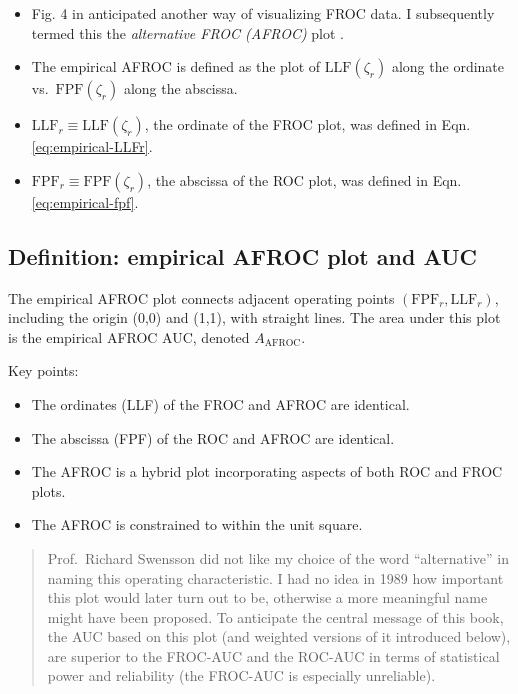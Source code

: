 \documentclass[
]{book}
\providecommand{\tightlist}{%
  \setlength{\itemsep}{0pt}\setlength{\parskip}{0pt}}
\begin{document}
\begin{itemize}
\tightlist
\item
  Fig. 4 in \citep{bunch1977free} anticipated another way of visualizing FROC data. I subsequently termed this the \emph{alternative FROC (AFROC)} plot \citep{chakraborty1989maximum}.
\item
  The empirical AFROC is defined as the plot of \(\text{LLF}(\zeta_r)\) along the ordinate vs.~\(\text{FPF}(\zeta_r)\) along the abscissa.
\item
  \(\text{LLF}_r \equiv \text{LLF}(\zeta_r)\), the ordinate of the FROC plot, was defined in Eqn. \eqref{eq:empirical-LLFr}.
\item
  \(\text{FPF}_r \equiv \text{FPF}(\zeta_r)\), the abscissa of the ROC plot, was defined in Eqn. \eqref{eq:empirical-fpf}.
\end{itemize}

\hypertarget{empirical-definition-empirical-auc-afroc}{%
\subsection{Definition: empirical AFROC plot and AUC}\label{empirical-definition-empirical-auc-afroc}}

The empirical AFROC plot connects adjacent operating points \(\left( \text{FPF}_r, \text{LLF}_r \right )\), including the origin (0,0) and (1,1), with straight lines. The area under this plot is the empirical AFROC AUC, denoted \(A_{\text{AFROC}}\).

Key points:

\begin{itemize}
\tightlist
\item
  The ordinates (LLF) of the FROC and AFROC are identical.
\item
  The abscissa (FPF) of the ROC and AFROC are identical.
\item
  The AFROC is a hybrid plot incorporating aspects of both ROC and FROC plots.
\item
  The AFROC is constrained to within the unit square.
\end{itemize}

\begin{quote}
Prof.~Richard Swensson did not like my choice of the word ``alternative'' in naming this operating characteristic. I had no idea in 1989 how important this plot would later turn out to be, otherwise a more meaningful name might have been proposed. To anticipate the central message of this book, the AUC based on this plot (and weighted versions of it introduced below), are superior to the FROC-AUC and the ROC-AUC in terms of statistical power and reliability (the FROC-AUC is especially unreliable).
\end{quote}
\end{document}
